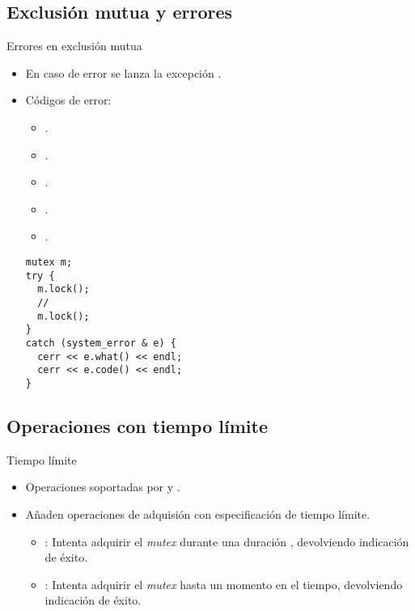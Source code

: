 \subsection{Exclusión mutua y errores}

\begin{frame}[fragile]{Errores en exclusión mutua}
\begin{itemize}
  \item En caso de error se lanza la excepción .
  \item Códigos de error:
    \begin{itemize}
      \item {}.
      \item {}.
      \item {}.
      \item {}.
      \item {}.
    \end{itemize}
\begin{lstlisting}
mutex m;
try {
  m.lock();
  // 
  m.lock();
}
catch (system_error & e) {
  cerr << e.what() << endl;
  cerr << e.code() << endl;
}
\end{lstlisting}
\end{itemize}
\end{frame}

\subsection{Operaciones con tiempo límite}

\begin{frame}{Tiempo límite}
\begin{itemize}
  \item Operaciones soportadas por  y .
  \item Añaden operaciones de adquisión con especificación de tiempo límite.
    \begin{itemize}
      \item {}: Intenta adquirir el \emph{mutex} durante una duración
            , devolviendo indicación de éxito.
      \item {}: Intenta adquirir el \emph{mutex} hasta un momento
            en el tiempo, devolviendo indicación de éxito.
    \end{itemize}
\end{itemize}
\end{frame}
